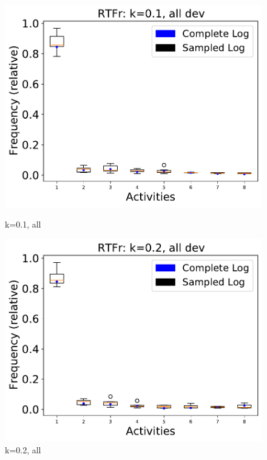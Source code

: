 \documentclass[landscape]{article}
\begin{document}
\begin{figure}[!htb]
	\centering
	\begin{minipage}{0.2\textwidth}
		\includegraphics[width=1.0\textwidth]{../RTFM_model2/RTFM_model2_deviationsApprox_0.1_NONALIGNING_ALL.pdf}
		\caption{k=0.1, all}
	\end{minipage}
	\hfill
	\begin{minipage}{0.2\textwidth}
		\includegraphics[width=1.0\textwidth]{../RTFM_model2/RTFM_model2_deviationsApprox_0.2_NONALIGNING_ALL.pdf}
		\caption{k=0.2, all}
	\end{minipage}
	\hfill
	\begin{minipage}{0.2\textwidth}

\end{minipage}
\end{figure}
\end{document}
